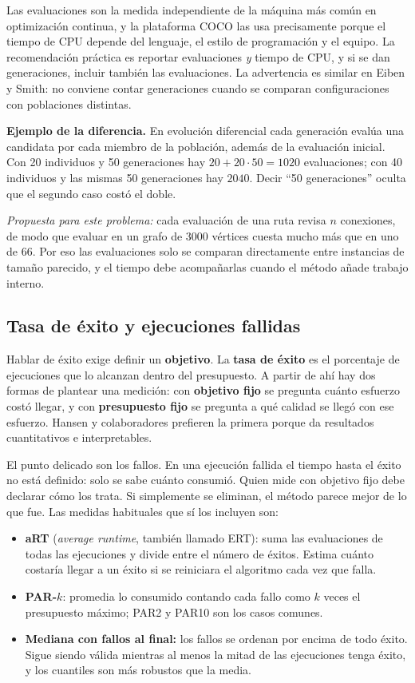 \documentclass[letterpaper,12pt]{report}
\begin{document}
Las evaluaciones son la medida independiente de la máquina más común en optimización continua, y la plataforma COCO las usa precisamente porque el tiempo de CPU depende del lenguaje, el estilo de programación y el equipo. La recomendación práctica es reportar evaluaciones \emph{y} tiempo de CPU, y si se dan generaciones, incluir también las evaluaciones. La advertencia es similar en Eiben y Smith: no conviene contar generaciones cuando se comparan configuraciones con poblaciones distintas.

\textbf{Ejemplo de la diferencia.} En evolución diferencial cada generación evalúa una candidata por cada miembro de la población, además de la evaluación inicial. Con 20 individuos y 50 generaciones hay $20+20\cdot 50=1020$ evaluaciones; con 40 individuos y las mismas 50 generaciones hay $2040$. Decir ``50 generaciones'' oculta que el segundo caso costó el doble.

\emph{Propuesta para este problema:} cada evaluación de una ruta revisa $n$ conexiones, de modo que evaluar en un grafo de 3000 vértices cuesta mucho más que en uno de 66. Por eso las evaluaciones solo se comparan directamente entre instancias de tamaño parecido, y el tiempo debe acompañarlas cuando el método añade trabajo interno.

\subsection{Tasa de éxito y ejecuciones fallidas}
Hablar de éxito exige definir un \textbf{objetivo}. La \textbf{tasa de éxito} es el porcentaje de ejecuciones que lo alcanzan dentro del presupuesto. A partir de ahí hay dos formas de plantear una medición: con \textbf{objetivo fijo} se pregunta cuánto esfuerzo costó llegar, y con \textbf{presupuesto fijo} se pregunta a qué calidad se llegó con ese esfuerzo. Hansen y colaboradores prefieren la primera porque da resultados cuantitativos e interpretables.

El punto delicado son los fallos. En una ejecución fallida el tiempo hasta el éxito no está definido: solo se sabe cuánto consumió. Quien mide con objetivo fijo debe declarar cómo los trata. Si simplemente se eliminan, el método parece mejor de lo que fue. Las medidas habituales que sí los incluyen son:
\begin{itemize}[leftmargin=*]
\item \textbf{aRT} (\emph{average runtime}, también llamado ERT): suma las evaluaciones de todas las ejecuciones y divide entre el número de éxitos. Estima cuánto costaría llegar a un éxito si se reiniciara el algoritmo cada vez que falla.
\item \textbf{PAR-$k$}: promedia lo consumido contando cada fallo como $k$ veces el presupuesto máximo; PAR2 y PAR10 son los casos comunes.
\item \textbf{Mediana con fallos al final:} los fallos se ordenan por encima de todo éxito. Sigue siendo válida mientras al menos la mitad de las ejecuciones tenga éxito, y los cuantiles son más robustos que la media.
\end{itemize}
\end{document}

